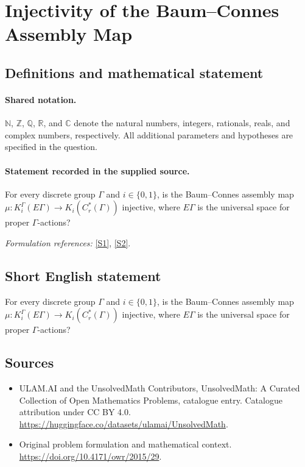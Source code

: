\documentclass[11pt]{article}
\newcommand{\sref}[2]{\hyperlink{source:#1:#2}{[S#2]}}
\begin{document}
\section{Injectivity of the Baum–Connes Assembly Map}\label{statement}

\subsection{Definitions and mathematical statement}

\paragraph{Shared notation.}$\mathbb N$, $\mathbb Z$, $\mathbb Q$, $\mathbb R$, and $\mathbb C$ denote the natural numbers, integers, rationals, reals, and complex numbers, respectively. All additional parameters and hypotheses are specified in the question.


\paragraph{Statement recorded in the supplied source.}
For every discrete group $\Gamma$ and $i\in\{0,1\}$, is the Baum–Connes assembly map $\mu:K_i^\Gamma(E\Gamma)\to K_i(C_r^*(\Gamma))$ injective, where $E\Gamma$ is the universal space for proper $\Gamma$-actions?
\par\smallskip\textit{Formulation references:} \sref{statement}{1}, \sref{statement}{2}.
\subsection{Short English statement}
For every discrete group $\Gamma$ and $i\in\{0,1\}$, is the Baum–Connes assembly map $\mu:K_i^\Gamma(E\Gamma)\to K_i(C_r^*(\Gamma))$ injective, where $E\Gamma$ is the universal space for proper $\Gamma$-actions?
\subsection{Sources}
\begin{itemize}
\item[\hypertarget{source:statement:1}{S1}] ULAM.AI and the UnsolvedMath Contributors, UnsolvedMath: A Curated Collection of Open Mathematics Problems, catalogue entry. Catalogue attribution under CC BY 4.0.
\url{https://huggingface.co/datasets/ulamai/UnsolvedMath}.
\item[\hypertarget{source:statement:2}{S2}] Original problem formulation and mathematical context.
\url{https://doi.org/10.4171/owr/2015/29}.
\end{itemize}
\label{end:statement}
\end{document}
